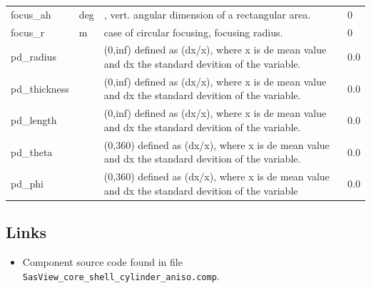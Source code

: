 \begin{longtable}{p{}p{}p{}p{}}
focus\_ah & deg & , vert. angular dimension of a rectangular area. & 0 \\
focus\_r & m & case of circular focusing, focusing radius. & 0 \\
pd\_radius &  & (0,inf) defined as (dx/x), where x is de mean value and dx the standard devition of the variable. & 0.0 \\
pd\_thickness &  & (0,inf) defined as (dx/x), where x is de mean value and dx the standard devition of the variable. & 0.0 \\
pd\_length &  & (0,inf) defined as (dx/x), where x is de mean value and dx the standard devition of the variable. & 0.0 \\
pd\_theta &  & (0,360) defined as (dx/x), where x is de mean value and dx the standard devition of the variable. & 0.0 \\
pd\_phi &  & (0,360) defined as (dx/x), where x is de mean value and dx the standard devition of the variable & 0.0 \\
\bottomrule
\end{longtable}

\subsection*{Links}
\begin{itemize}
  \item Component source code found in file \texttt{SasView\_core\_shell\_cylinder\_aniso.comp}.
\end{itemize}
